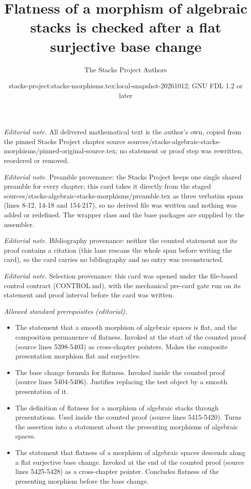 \documentclass[10pt,a4paper]{amsart}
\title{Flatness of a morphism of algebraic stacks is checked after a flat surjective base change}
\author{The Stacks Project Authors}
\date{stacks-project:stacks-morphisms.tex:local-snapshot-20261012; GNU FDL 1.2 or later}
\theoremstyle{plain}
\theoremstyle{definition}
\theoremstyle{remark}
\numberwithin{equation}{subsection}
\begin{document}
\maketitle
\noindent\textit{Editorial note.} All delivered mathematical text is the author's own, copied from the pinned Stacks Project chapter source sources/stacks-algebraic-stacks-morphisms/pinned-original-source.tex; no statement or proof step was rewritten, reordered or removed.\par\medskip
\noindent\textit{Editorial note.} Preamble provenance: the Stacks Project keeps one single shared preamble for every chapter; this card takes it directly from the staged sources/stacks-algebraic-stacks-morphisms/preamble.tex as three verbatim spans (lines 8-12, 14-18 and 154-217), so no derived file was written and nothing was added or redefined. The wrapper class and the base packages are supplied by the assembler.\par\medskip
\noindent\textit{Editorial note.} Bibliography provenance: neither the counted statement nor its proof contains a citation (this lane rescans the whole span before writing the card), so the card carries no bibliography and no entry was reconstructed.\par\medskip
\noindent\textit{Editorial note.} Selection provenance: this card was opened under the file-based control contract (CONTROL.md), with the mechanical pre-card gate run on its statement and proof interval before the card was written.\par\medskip
\noindent\textit{Allowed standard prerequisites (editorial).}\begin{itemize}
\item The statement that a smooth morphism of algebraic spaces is flat, and the composition permanence of flatness. Invoked at the start of the counted proof (source lines 5398-5403) as cross-chapter pointers. Makes the composite presentation morphism flat and surjective.
\item The base change formula for flatness. Invoked inside the counted proof (source lines 5404-5406). Justifies replacing the test object by a smooth presentation of it.
\item The definition of flatness for a morphism of algebraic stacks through presentations. Used inside the counted proof (source lines 5415-5420). Turns the assertion into a statement about the presenting morphisms of algebraic spaces.
\item The statement that flatness of a morphism of algebraic spaces descends along a flat surjective base change. Invoked at the end of the counted proof (source lines 5425-5428) as a cross-chapter pointer. Concludes flatness of the presenting morphism before the base change.
\end{itemize}\medskip
\end{document}
